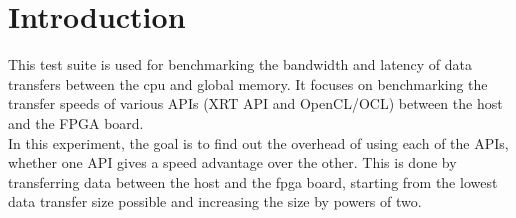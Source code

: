 \section{Introduction}
This test suite is used for benchmarking the bandwidth and latency of data transfers between the cpu and global memory. It focuses on benchmarking the transfer speeds of various APIs (XRT API and OpenCL/OCL) between the host and the FPGA board. \\

In this experiment, the goal is to find out the overhead of using each of the APIs, whether one API gives a speed advantage over the other. This is done by transferring data between the host and the fpga board, starting from the lowest data transfer size possible and increasing the size by powers of two.

